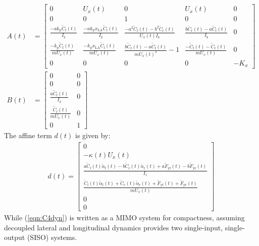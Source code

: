 \begin{align}
\label{eqn:C4dyn}
 A(t)  &= \begin{bmatrix}
  0 & U_x(t) & 0 & U_x(t) & 0\\ 
  0 & 0 & 1 & 0 & 0 \\ 
  \frac{-ak_\mathrm{p} \tilde{C}_\mathrm{f}(t)}{I_\mathrm{z}}  & \frac{-ak_\mathrm{p}x_\mathrm{LA}\tilde{C}_\mathrm{f}(t)}{I_\mathrm{z}}  & \frac{-a^2\tilde{C}_\mathrm{f}(t)-b^2\tilde{C}_\mathrm{r}(t)}{U_x(t)I_\mathrm{z}} & \frac{b\tilde{C}_\mathrm{r}(t) - a\tilde{C}_\mathrm{f}(t)}{I_\mathrm{z}} & 0 \\
  \frac{-k_\mathrm{p}\tilde{C}_\mathrm{f}(t)}{mU_x(t)}  & \frac{-k_\mathrm{p}x_\mathrm{LA}\tilde{C}_\mathrm{f}(t)}{mU_x(t)}  & \frac{b\tilde{C}_\mathrm{r}(t)-a\tilde{C}_\mathrm{f}(t)}{mU_x(t)^2}-1 & \frac{-\tilde{C}_\mathrm{f}(t) - \tilde{C}_\mathrm{r}(t)}{mU_x(t)} & 0 \\
  0 & 0 & 0 & 0 & -K_x 
  \end{bmatrix} \\
B(t) &=\begin{bmatrix} 0 & 0 \\	 	0 & 0 		\\ 		\frac{a \tilde{C}_\mathrm{f}(t)}{I_\mathrm{z}} & 0 		\\ 		\frac{\tilde{C}_\mathrm{f}(t)}{mU_x(t)} & 0 		\\ 0 & 1 \end{bmatrix} 
\end{align}
The affine term $d(t)$ is given by: 
\begin{align}
d(t) = \left[\begin{matrix} 0 \\
               -\kappa(t) U_x(t) \\ 
			    \frac{a\tilde{C}_\mathrm{f}(t)\tilde{\alpha}_\mathrm{f}(t) - b\tilde{C}_\mathrm{r}(t)\tilde{\alpha}_\mathrm{r}(t) + a\tilde{F}_\mathrm{yf}(t) - b\tilde{F}_\mathrm{yr}(t)}{I_z}\\
				\frac{\tilde{C}_\mathrm{f}(t)\tilde{\alpha}_\mathrm{f}(t) + \tilde{C}_\mathrm{r}(t)\tilde{\alpha}_\mathrm{r}(t) + \tilde{F}_\mathrm{yf}(t) + \tilde{F}_\mathrm{yr}(t)}{mU_x(t)}\\
				0 \\
				0
				\end{matrix}\right]
\end{align}
While (\ref{eqn:C4dyn}) is written as a MIMO system for compactness, assuming decoupled lateral and longitudinal 
dynamics provides two single-input, single-output (SISO) systems. 

